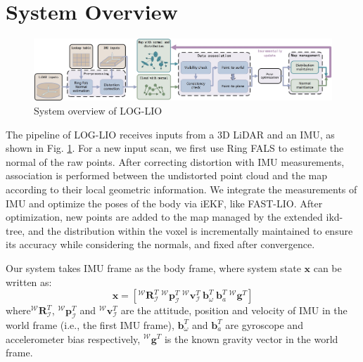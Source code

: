 \documentclass[letterpaper, 10 pt, conference]{ieeeconf}  %
\begin{document}
\section{System Overview}
\label{sec:system_overview}

\begin{figure}[!ht]
        \centering
        \includegraphics[width=16cm]{fig/overview_3.jpg}
        \caption{System overview of LOG-LIO}
        \label{fig_overview}
\end{figure}
The pipeline of LOG-LIO receives inputs from a 3D LiDAR and an IMU, as shown in Fig. \ref{fig_overview}.
For a new input scan, we first use Ring FALS to estimate the normal of the raw points.
After correcting distortion with IMU measurements, association is performed between the undistorted point cloud and the map according to their local geometric information.
We integrate the measurements of IMU and optimize the poses of the body via iEKF, like FAST-LIO.
After optimization, new points are added to the map managed by the extended ikd-tree, and the distribution within the voxel is incrementally maintained to ensure its accuracy while considering the normals, and fixed after convergence.

Our system takes IMU frame as the body frame, where system state $\mathbf{x}$ can be written as:
\begin{equation}
        \mathbf{x} = \left[^\mathcal{W}\mathbf{R}^T_\mathcal{I}\ ^\mathcal{W}\mathbf{p}^T_\mathcal{I}\ ^\mathcal{W}\mathbf{v}^T_\mathcal{I}\ \mathbf{b}^T_\omega\ \mathbf{b}^T_a\ ^\mathcal{W}\mathbf{g}^T\right]
        \label{eq_x}
\end{equation}
where$^\mathcal{W}\mathbf{R}^T_\mathcal{I}$, $^\mathcal{W}\mathbf{p}^T_\mathcal{I}$ and $^\mathcal{W}\mathbf{v}^T_\mathcal{I}$ are the attitude, position and velocity of IMU in the world frame (i.e., the first IMU frame), $\mathbf{b}^T_\omega$ and $\mathbf{b}^T_a$ are gyroscope and accelerometer bias respectively, $^\mathcal{W}\mathbf{g}^T$ is the known gravity vector in the world frame.
\end{document}
